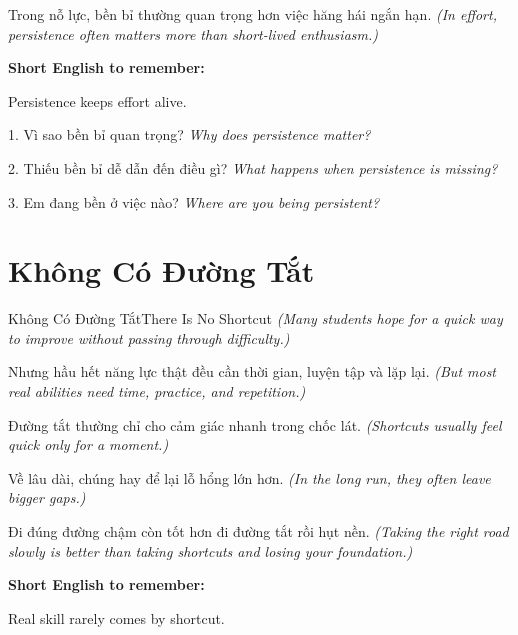 \begin{baihoc}
Trong nỗ lực, bền bỉ thường quan trọng hơn việc hăng hái ngắn hạn.
\textit{(In effort, persistence often matters more than short-lived enthusiasm.)}
\end{baihoc}

\begin{ghinhoanh}
\textbf{Short English to remember:}

Persistence keeps effort alive.

\end{ghinhoanh}

\begin{tuhocnhanh}
1. Vì sao bền bỉ quan trọng? \textit{Why does persistence matter?}

2. Thiếu bền bỉ dễ dẫn đến điều gì? \textit{What happens when persistence is missing?}

3. Em đang bền ở việc nào? \textit{Where are you being persistent?}
\end{tuhocnhanh}
\ngancach

\section{Không Có Đường Tắt}
\begin{truyen}{Không Có Đường Tắt}{There Is No Shortcut}
\textit{(Many students hope for a quick way to improve without passing through difficulty.)}

Nhưng hầu hết năng lực thật đều cần thời gian, luyện tập và lặp lại.
\textit{(But most real abilities need time, practice, and repetition.)}

Đường tắt thường chỉ cho cảm giác nhanh trong chốc lát.
\textit{(Shortcuts usually feel quick only for a moment.)}

Về lâu dài, chúng hay để lại lỗ hổng lớn hơn.
\textit{(In the long run, they often leave bigger gaps.)}
\end{truyen}

\begin{baihoc}
Đi đúng đường chậm còn tốt hơn đi đường tắt rồi hụt nền.
\textit{(Taking the right road slowly is better than taking shortcuts and losing your foundation.)}
\end{baihoc}

\begin{ghinhoanh}
\textbf{Short English to remember:}

Real skill rarely comes by shortcut.

\end{ghinhoanh}

